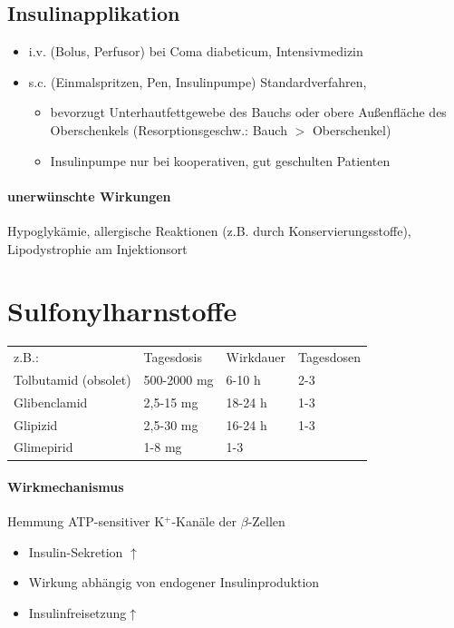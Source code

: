 \documentclass[10pt,a4paper]{report}
\begin{document}
\subsection{Insulinapplikation} %
\label{ssub:insulinapplikation}
\begin{itemize}
	\item i.v.	(Bolus, Perfusor) bei Coma diabeticum, Intensivmedizin
	\item s.c.	(Einmalspritzen, Pen, Insulinpumpe) Standardverfahren,
	\begin{itemize}
		\item bevorzugt Unterhautfettgewebe des Bauchs oder obere Außenfläche des Oberschenkels (Resorptionsgeschw.: Bauch $>$ Oberschenkel)
		\item Insulinpumpe nur bei kooperativen, gut geschulten Patienten
	\end{itemize}
\end{itemize}
\paragraph{unerwünschte Wirkungen} %
\label{subp:unerw_nschte_wirkungen}
Hypoglykämie, allergische Reaktionen (z.B. durch Konservierungsstoffe), Lipodystrophie am Injektionsort
\section{Sulfonylharnstoffe} %
\label{sec:sulfonylharnstoffe}
\begin{tabularx}{\textwidth}{XXXX}
z.B.:&Tagesdosis&Wirkdauer&Tagesdosen\\
Tolbutamid (obsolet)&500-2000 mg&6-10 h&2-3\\
Glibenclamid&2,5-15 mg&18-24 h&1-3\\
Glipizid&2,5-30 mg&16-24 h&1-3\\
Glimepirid&1-8 mg&1-3\\
\end{tabularx}
\paragraph{Wirkmechanismus} %
\label{subp:wirkmechanismus}
Hemmung ATP-sensitiver K$^+$-Kanäle der $\beta$-Zellen
\begin{itemize}
	\item Insulin-Sekretion $\uparrow$
	\item Wirkung abhängig von endogener Insulinproduktion
	\item Insulinfreisetzung$\uparrow$
\end{itemize}
\end{document}
